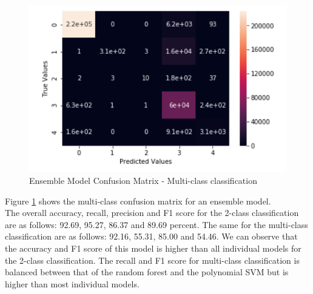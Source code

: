 \begin{figure}
	\includegraphics[width=1.0\columnwidth]{images/ensembleall.PNG}
	\caption{Ensemble Model Confusion Matrix - Multi-class classification}
	\label{F:enall}
\end{figure}
Figure \ref{F:enall} shows the multi-class confusion matrix for an ensemble model.\\
The overall accuracy, recall, precision and F1 score for the 2-class classification are as follows: 92.69, 95.27, 86.37 and 89.69 percent. The same for the multi-class classification are as follows: 92.16, 55.31, 85.00
and 54.46. We can observe that the accuracy and F1 score of this model is  higher than all individual models for the 2-class classification. The recall and F1 score for multi-class classification is balanced between that of the random forest and the polynomial SVM but is higher than most individual models.

